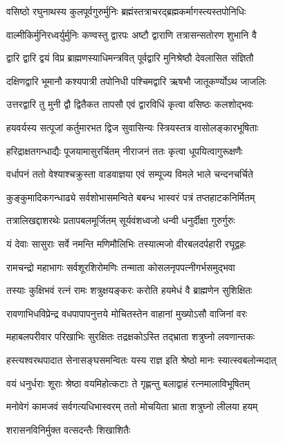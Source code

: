 \twolineshloka
{वसिष्ठो रघुनाथस्य कुलपूर्वगुरुर्मुनिः}
{ब्रह्मंस्तत्राचरद्ब्रह्मकर्मागस्त्यस्तपोनिधिः}%

\twolineshloka
{वाल्मीकिर्मुनिरध्वर्युर्मुनिः कण्वस्तु द्वारपः}
{अष्टौ द्वाराणि तत्रासन्सतोरण शुभानि वै}%

\twolineshloka
{द्वारि द्वारि द्वयं विप्र ब्राह्मणस्याधिमन्त्रवित्}
{पूर्वद्वारि मुनिश्रेष्ठौ देवलासित संज्ञितौ}%

\twolineshloka
{दक्षिणद्वारि भूमानौ कश्यपात्री तपोनिधी}
{पश्चिमद्वारि ऋषभौ जातूकर्ण्योऽथ जाजलिः}%

\twolineshloka
{उत्तरद्वारि तु मुनी द्वौ द्वितैकत तापसौ}
{एवं द्वारविधिं कृत्वा वसिष्ठः कलशोद्भवः}%

\twolineshloka
{हयवर्यस्य सत्पूजां कर्तुमारभत द्विज}
{सुवासिन्यः स्त्रियस्तत्र वासोलङ्कारभूषिताः}%

\twolineshloka
{हरिद्राक्षतगन्धाद्यैः पूजयामासुरर्चितम्}
{नीराजनं ततः कृत्वा धूपयित्वागुरूक्षणैः}%

\twolineshloka
{वर्धापनं ततो वेश्याश्चक्रुस्ता वाडवाज्ञया}
{एवं सम्पूज्य विमले भाले चन्दनचर्चिते}%

\twolineshloka
{कुङ्कुमादिकगन्धाढ्ये सर्वशोभासमन्विते}
{बबन्ध भास्वरं पत्रं तप्तहाटकनिर्मितम्}%

\twolineshloka
{तत्रालिखद्दाशरथेः प्रतापबलमूर्जितम्}
{सूर्यवंशध्वजो धन्वी धनुर्दीक्षा गुरुर्गुरुः}%

\twolineshloka
{यं देवाः सासुराः सर्वे नमन्ति मणिमौलिभिः}
{तस्यात्मजो वीरबलदर्पहारी रघूद्वहः}%

\twolineshloka
{रामचन्द्रो महाभागः सर्वशूरशिरोमणिः}
{तन्माता कोसलनृपपत्नीगर्भसमुद्भवा}%

\twolineshloka
{तस्याः कुक्षिभवं रत्नं रामः शत्रुक्षयङ्करः}
{करोति हयमेधं वै ब्राह्मणेन सुशिक्षितः}%

\twolineshloka
{रावणाभिधविप्रेन्द्र वधपापापनुत्तये}
{मोचितस्तेन वाहानां मुख्योऽसौ वाजिनां वरः}%

\twolineshloka
{महाबलपरीवार परिखाभिः सुरक्षितः}
{तद्रक्षकोऽस्ति तद्भ्राता शत्रुघ्नो लवणान्तकः}%

\twolineshloka
{हस्त्यश्वरथपादात सेनासङ्घसमन्वितः}
{यस्य राज्ञ इति श्रेष्ठो मानः स्यात्स्वबलोन्मदात्}%

\twolineshloka
{वयं धनुर्धराः शूराः श्रेष्ठा वयमिहोत्कटाः}
{ते गृह्णन्तु बलाद्वाहं रत्नमालाविभूषितम्}%

\twolineshloka
{मनोवेगं कामजवं सर्वगत्यधिभास्वरम्}
{ततो मोचयिता भ्राता शत्रुघ्नो लीलया हयम्}%

\onelineshloka
{शरासनविनिर्मुक्त वत्सदन्तैः शिखाशितैः}%


